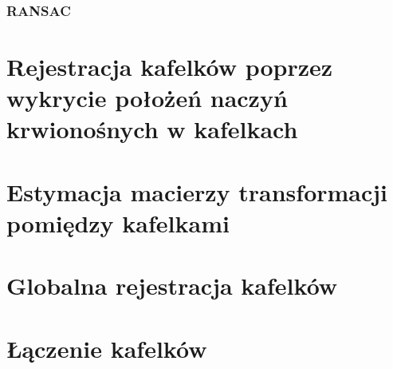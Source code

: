 \subsubsection{RANSAC}
\label{sec:proponowane_algorytmy:ransac}

\section{Rejestracja kafelków poprzez wykrycie położeń naczyń krwionośnych w kafelkach}
\label{sec:proponowane_algorytmy:depth_first_search}

\section{Estymacja macierzy transformacji pomiędzy kafelkami}
\label{sec:proponowane_algorytmy:estymacja}

\section{Globalna rejestracja kafelków}
\label{sec:proponowane_algorytmy:globalna_rejestracja}

\section{Łączenie kafelków}
\label{sec:proponowane_algorytmy:laczenie_kafelkow}

